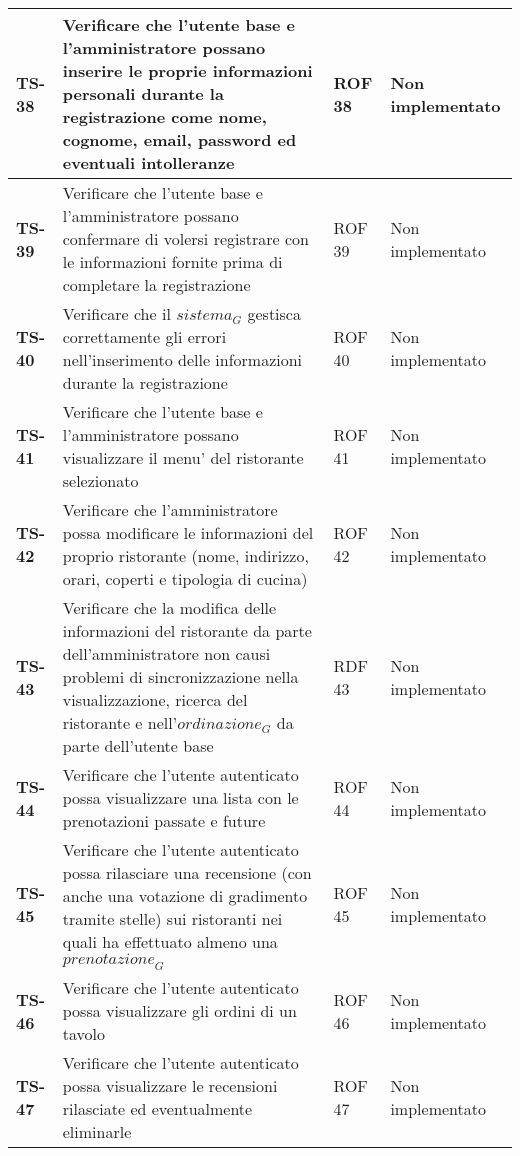 \begin{longtable}{|>{\centering\arraybackslash}p{1.5cm}|p{9.8cm}|p{2cm}|p{3.5cm}|}
    \hline
    \rowcolor{gray!10}
    \textbf{TS-38} & Verificare che l'utente base e l'amministratore possano inserire le proprie informazioni personali durante la registrazione come nome, cognome, email, password ed eventuali intolleranze & ROF 38 & Non implementato \\
    \hline
    \rowcolor{gray!10}
    \textbf{TS-39} & Verificare che l'utente base e l'amministratore possano confermare di volersi registrare con le informazioni fornite prima di completare la registrazione & ROF 39 & Non implementato \\ 
    \hline
    \rowcolor{gray!10}
    \textbf{TS-40} & Verificare che il $\textit{sistema}_G$ gestisca correttamente gli errori nell'inserimento delle informazioni durante la registrazione & ROF 40 & Non implementato \\ 
    \hline
    \rowcolor{gray!10}
    \textbf{TS-41} & Verificare che l'utente base e l'amministratore possano visualizzare il menu' del ristorante selezionato & ROF 41 & Non implementato \\ 
    \hline
    \rowcolor{gray!10}
    \textbf{TS-42} & Verificare che l'amministratore possa modificare le informazioni del proprio ristorante (nome, indirizzo, orari, coperti e tipologia di cucina) & ROF 42 & Non implementato \\
    \hline
    \rowcolor{gray!10}
    \textbf{TS-43} & Verificare che la modifica delle informazioni del ristorante da parte dell'amministratore non causi problemi di sincronizzazione nella visualizzazione, ricerca del ristorante e nell'$\textit{ordinazione}_G$ da parte dell'utente base & RDF 43 & Non implementato \\ 
    \hline
    \rowcolor{gray!10}
    \textbf{TS-44} & Verificare che l'utente autenticato possa visualizzare una lista con le prenotazioni passate e future & ROF 44 & Non implementato \\ 
    \hline
    \rowcolor{gray!10}
    \textbf{TS-45} & Verificare che l'utente autenticato possa rilasciare una recensione (con anche una votazione di gradimento tramite stelle) sui ristoranti nei quali ha effettuato almeno una $\textit{prenotazione}_G$ & ROF 45 & Non implementato \\ 
    \hline
    \rowcolor{gray!10}
    \textbf{TS-46} & Verificare che l'utente autenticato possa visualizzare gli ordini di un tavolo & ROF 46 & Non implementato \\ 
    \hline
    \rowcolor{gray!10}
    \textbf{TS-47} & Verificare che l'utente autenticato possa visualizzare le recensioni rilasciate ed eventualmente eliminarle & ROF 47 & Non implementato \\ 

\end{longtable}
